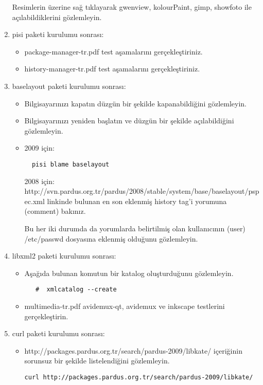\documentclass[a4paper,10pt]{article}
\begin{document}
\begin{enumerate}
Resimlerin üzerine sağ tıklayarak gwenview, kolourPaint, gimp, showfoto ile açılabildiklerini gözlemleyin.
\item pisi paketi kurulumu sonrası:
\begin{itemize}
 \item package-manager-tr.pdf test aşamalarını gerçekleştiriniz.
 \item history-manager-tr.pdf test aşamalarını gerçekleştiriniz.
\end{itemize}
\item baselayout paketi kurulumu sonrası:
\begin{itemize}
 \item Bilgisayarınızı kapatın düzgün bir şekilde kapanabildiğini gözlemleyin.
 \item Bilgisayarınızı yeniden başlatın ve düzgün bir şekilde açılabildiğini gözlemleyin.
 \item 2009 için:
  \begin{verbatim}
  pisi blame baselayout
  \end{verbatim}
      2008 için: http://svn.pardus.org.tr/pardus/2008/stable/system/base/baselayout/pspec.xml linkinde bulunan en son eklenmiş history tag'i yorumuna (comment) bakınız.

   Bu her iki durumda da yorumlarda belirtilmiş olan kullanıcının (user) /etc/passwd dosyasına eklenmiş olduğunu gözlemleyin.

\end{itemize}
\item libxml2 paketi kurulumu sonrası:

\begin{itemize}
\item Aşağıda bulunan komutun bir katalog oluşturduğunu gözlemleyin.
  \begin{verbatim}
   #  xmlcatalog --create
  \end{verbatim}
\item multimedia-tr.pdf avidemux-qt, avidemux ve inkscape testlerini gerçekleştirin.
\end{itemize}
\item curl paketi kurulumu sonrası:

\begin{itemize}
\item http://packages.pardus.org.tr/search/pardus-2009/libkate/ içeriğinin sorunsuz bir şekilde listelendiğini gözlemleyin.
\begin{verbatim}
curl http://packages.pardus.org.tr/search/pardus-2009/libkate/
\end{verbatim}


\end{itemize}
\end{enumerate}
\end{document}
